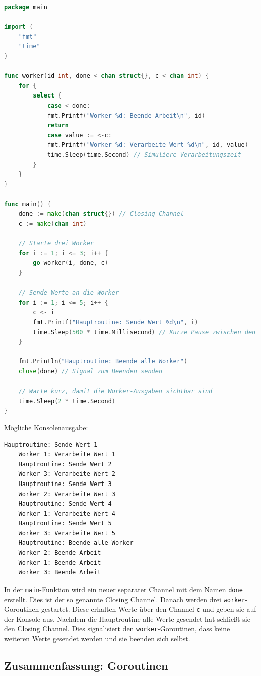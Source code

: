\documentclass[fontsize=12pt,paper=a4,twoside=semi,parskip=half-,headsepline,headinclude]{scrreprt}
\begin{document}
\begin{lstlisting}[language=Go,extendedchars=true]
package main

import (
	"fmt"
	"time"
)

func worker(id int, done <-chan struct{}, c <-chan int) {
	for {
		select {
			case <-done:
			fmt.Printf("Worker %d: Beende Arbeit\n", id)
			return
			case value := <-c:
			fmt.Printf("Worker %d: Verarbeite Wert %d\n", id, value)
			time.Sleep(time.Second) // Simuliere Verarbeitungszeit
		}
	}
}

func main() {
	done := make(chan struct{}) // Closing Channel
	c := make(chan int)
	
	// Starte drei Worker
	for i := 1; i <= 3; i++ {
		go worker(i, done, c)
	}
	
	// Sende Werte an die Worker
	for i := 1; i <= 5; i++ {
		c <- i
		fmt.Printf("Hauptroutine: Sende Wert %d\n", i)
		time.Sleep(500 * time.Millisecond) // Kurze Pause zwischen den Sendungen
	}
	
	fmt.Println("Hauptroutine: Beende alle Worker")
	close(done) // Signal zum Beenden senden
	
	// Warte kurz, damit die Worker-Ausgaben sichtbar sind
	time.Sleep(2 * time.Second)
}
\end{lstlisting}
Mögliche Konsolenausgabe:
\begin{lstlisting}[frame=shadowbox, rulecolor=\color{black}, backgroundcolor=\color{gray!10}]
	Hauptroutine: Sende Wert 1
	Worker 1: Verarbeite Wert 1
	Hauptroutine: Sende Wert 2
	Worker 3: Verarbeite Wert 2
	Hauptroutine: Sende Wert 3
	Worker 2: Verarbeite Wert 3
	Hauptroutine: Sende Wert 4
	Worker 1: Verarbeite Wert 4
	Hauptroutine: Sende Wert 5
	Worker 3: Verarbeite Wert 5
	Hauptroutine: Beende alle Worker
	Worker 2: Beende Arbeit
	Worker 1: Beende Arbeit
	Worker 3: Beende Arbeit
\end{lstlisting}

In der \texttt{main}-Funktion wird ein neuer separater Channel mit dem Namen \texttt{done} erstellt. Dies ist der so genannte Closing Channel. Danach werden drei \texttt{worker}-Goroutinen ge\-star\-tet. Diese erhalten Werte über den Channel \texttt{c} und geben sie auf der Konsole aus. Nachdem die Hauptroutine alle Werte gesendet hat schließt sie den Closing Channel. Dies signalisiert den  \texttt{worker}-Goroutinen, dass keine weiteren Werte gesendet werden und sie beenden sich selbst.

\subsection{Zusammenfassung: Goroutinen}
\end{document}
